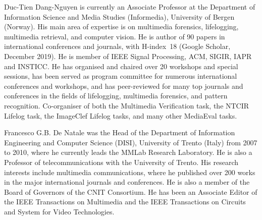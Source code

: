 \documentclass{ieeeaccess}
\begin{document}
\begin{IEEEbiography}{Duc-Tien Dang-Nguyen} is currently an Associate Professor at the Department of Information Science and Media Studies (Informedia), University of Bergen (Norway). His main area of expertise is on multimedia forensics, lifelogging, multimedia retrieval, and computer vision. 
%
He is author of 90 papers in international conferences and journals, with H-index~18 (Google Scholar, December 2019). He is member of IEEE Signal Processing, ACM, SIGIR, IAPR and INSTICC.  
He has organised and chaired over 20 workshops and special sessions, has been served as program committee for numerous international conferences and workshops, and has peer-reviewed for many top journals and conferences in the fields of lifelogging, multimedia forensics, and pattern recognition. Co-organiser of both the Multimedia Verification task, the NTCIR Lifelog task, the ImageClef Lifelog tasks, and many other MediaEval tasks. 
\end{IEEEbiography}

\begin{IEEEbiography}{Francesco G.B. De Natale} was the Head of the Department of Information Engineering and Computer Science (DISI), University of Trento (Italy) from 2007 to 2010, where he currently leads the MMLab Research Laboratory. He is also a Professor of telecommunications with the University of Trento. His research interests include multimedia communications, where he published over 200 works in the major international journals and conferences. He is also a member of the Board of Governors of the CNIT Consortium. He has been an Associate Editor of the IEEE Transactions on Multimedia and the IEEE Transactions on Circuits and System for Video Technologies.
\end{IEEEbiography}

\EOD
\end{document}
